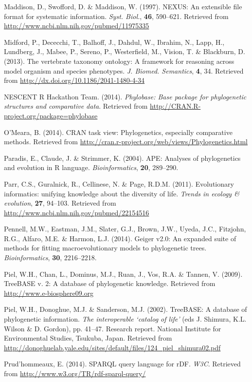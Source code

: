 \documentclass[author-year, review, 11pt]{components/elsarticle} %
\begin{document}
Maddison, D., Swofford, D. \& Maddison, W. (1997). NEXUS: An extensible
file format for systematic information. \emph{Syst. Biol.}, \textbf{46},
590--621. Retrieved from
\url{http://www.ncbi.nlm.nih.gov/pubmed/11975335}

Midford, P., Dececchi, T., Balhoff, J., Dahdul, W., Ibrahim, N., Lapp,
H., Lundberg, J., Mabee, P., Sereno, P., Westerfield, M., Vision, T. \&
Blackburn, D. (2013). The vertebrate taxonomy ontology: A framework for
reasoning across model organism and species phenotypes. \emph{J. Biomed.
Semantics}, \textbf{4}, 34. Retrieved from
\url{http://dx.doi.org/10.1186/2041-1480-4-34}

NESCENT R Hackathon Team. (2014). \emph{Phylobase: Base package for
phylogenetic structures and comparative data}. Retrieved from
\url{http://CRAN.R-project.org/package=phylobase}

O'Meara, B. (2014). CRAN task view: Phylogenetics, especially
comparative methods. Retrieved from
\url{http://cran.r-project.org/web/views/Phylogenetics.html}

Paradis, E., Claude, J. \& Strimmer, K. (2004). APE: Analyses of
phylogenetics and evolution in R language. \emph{Bioinformatics},
\textbf{20}, 289--290.

Parr, C.S., Guralnick, R., Cellinese, N. \& Page, R.D.M. (2011).
Evolutionary informatics: unifying knowledge about the diversity of
life. \emph{Trends in ecology \& evolution}, \textbf{27}, 94--103.
Retrieved from \url{http://www.ncbi.nlm.nih.gov/pubmed/22154516}

Pennell, M.W., Eastman, J.M., Slater, G.J., Brown, J.W., Uyeda, J.C.,
Fitzjohn, R.G., Alfaro, M.E. \& Harmon, L.J. (2014). Geiger v2.0: An
expanded suite of methods for fitting macroevolutionary models to
phylogenetic trees. \emph{Bioinformatics}, \textbf{30}, 2216--2218.

Piel, W.H., Chan, L., Dominus, M.J., Ruan, J., Vos, R.A. \& Tannen, V.
(2009). TreeBASE v. 2: A database of phylogenetic knowledge. Retrieved
from \url{http://www.e-biosphere09.org}

Piel, W.H., Donoghue, M.J. \& Sanderson, M.J. (2002). TreeBASE: A
database of phylogenetic information. \emph{The interoperable `catalog
of life'} (eds J. Shimura, K.L. Wilson \& D. Gordon), pp. 41--47.
Research report. National Institute for Environmental Studies, Tsukuba,
Japan. Retrieved from
\url{http://donoghuelab.yale.edu/sites/default/files/124_piel_shimura02.pdf}

Prud'hommeaux, E. (2014). SPARQL query language for rDF. \emph{W3C}.
Retrieved from \url{http://www.w3.org/TR/rdf-sparql-query/}
\end{document}
